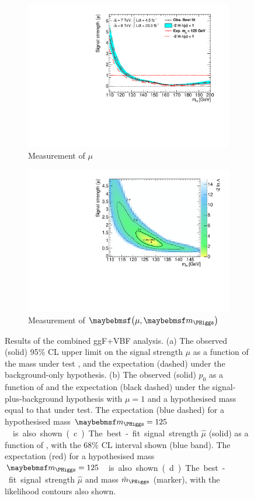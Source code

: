 \begin{figure}[p]
\begin{subfigure}[b]{0.495\textwidth}
		\includegraphics[width=\textwidth,clip=true,trim=0.6cm 0.8cm 1.0cm 0.4cm]{custom_images/limits/mu_combined}
		\caption{Measurement of $\mu$}
		\label{fig:comb_results:mu}
	\end{subfigure}
	\hfill
	\begin{subfigure}[b]{0.495\textwidth}
		\centering
		\includegraphics[width=\textwidth,clip=true,trim=0.6cm 0.8cm 1.0cm 0.4cm]{custom_images/limits/mu_vs_mH_combined}
		\caption{Measurement of $\parenths{\mu, \mH}$}
		\label{fig:comb_results:mu_mH}
	\end{subfigure}
	\caption{Results of the combined ggF+VBF analysis. (a) The observed (solid) 95\% CL 
	upper limit on the signal strength $\mu$ as a function of the mass under test \mH, and 
	the expectation (dashed) under the background-only hypothesis. (b) The observed (solid) 
	$p_0$ as a function of \mH and the expectation (black dashed) under the 
	signal-plus-background hypothesis with $\mu = 1$ and a hypothesised mass equal to that 
	under test.	The expectation (blue dashed) for a hypothesised mass 
	\unit{$\mH = 125$}{\GeV} is also shown. (c) The best-fit signal strength $\hat{\mu}$ 
	(solid) as a function of \mH, with the 68\% CL interval shown (blue band). The 
	expectation (red) for a hypothesised mass \unit{$\mH = 125$}{\GeV} is also shown. 
	(d) The best-fit signal strength $\hat{\mu}$ and mass $\hat{m}_{\PHiggs}$ (marker), with 
	the likelihood contours also shown.}
\end{figure}

